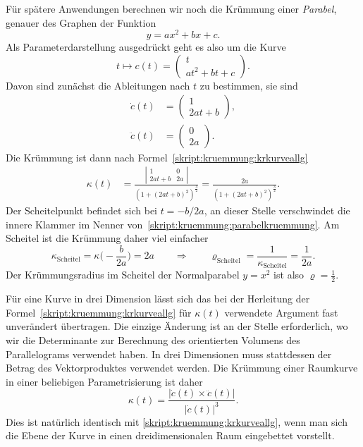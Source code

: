 \begin{beispiel}
Für spätere Anwendungen berechnen wir noch die Krümmung einer {\em Parabel},
genauer des Graphen der Funktion
\[
y = ax^2 + bx + c.
\]
Als Parameterdarstellung ausgedrückt geht es also um die Kurve
\[
t\mapsto c(t)
=
\begin{pmatrix}
t\\
at^2+bt+c
\end{pmatrix}.
\]
Davon sind zunächst die Ableitungen nach $t$ zu bestimmen, sie sind
\begin{align*}
\dot c(t)
&=
\begin{pmatrix}1\\2at+b\end{pmatrix},
\\
\ddot c(t)
&=
\begin{pmatrix}0\\2a\end{pmatrix}.
\end{align*}
Die Krümmung ist dann nach Formel~\eqref{skript:kruemmung:krkurveallg}
\begin{align}
\kappa(t)
&=
\frac{\left|\begin{matrix}1&0\\2at+b&2a\end{matrix}\right|}{
(1+(2at+b)^2)^{\frac32}
}
=
\frac{2a}{(1+(2at+b)^2)^{\frac32}}.
\label{skript:kruemmung:parabelkruemmung}
\end{align}
Der Scheitelpunkt befindet sich bei $t=-b/2a$, an dieser Stelle verschwindet
die innere Klammer im Nenner von~\eqref{skript:kruemmung:parabelkruemmung}.
Am Scheitel ist die Krümmung daher viel einfacher
\begin{equation}
\kappa_{\text{Scheitel}}
=
\kappa\biggl(-\frac{b}{2a}\biggr)
=
2a
\qquad
\Rightarrow
\qquad
\varrho_{\text{Scheitel}}
=
\frac1{\kappa_{\text{Scheitel}}}
=
\frac1{2a}.
\label{skript:kruemmung:parabel:scheitel}
\end{equation}
Der Krümmungsradius im Scheitel der Normalparabel $y=x^2$ ist also
$\varrho=\frac12$.
\end{beispiel}

Für eine Kurve in drei Dimension lässt sich das bei der Herleitung
der Formel~\eqref{skript:kruemmung:krkurveallg} für $\kappa(t)$
verwendete Argument fast unverändert übertragen.
Die einzige Änderung ist an der Stelle erforderlich, wo wir die Determinante
zur Berechnung des orientierten Volumens des Parallelograms verwendet
haben.
In drei Dimensionen muss stattdessen der Betrag des Vektorproduktes 
verwendet werden.
Die Krümmung einer Raumkurve in einer beliebigen Parametrisierung ist
daher
\begin{equation}
\kappa(t)
=
\frac{|\dot c(t)\times \ddot c(t)|}{|\dot c(t)|^3}.
\label{skript:kruemmung:krkurveallg3d}
\end{equation}
Dies ist natürlich identisch mit \eqref{skript:kruemmung:krkurveallg},
wenn man sich die Ebene der Kurve in einen dreidimensionalen Raum
eingebettet vorstellt.

